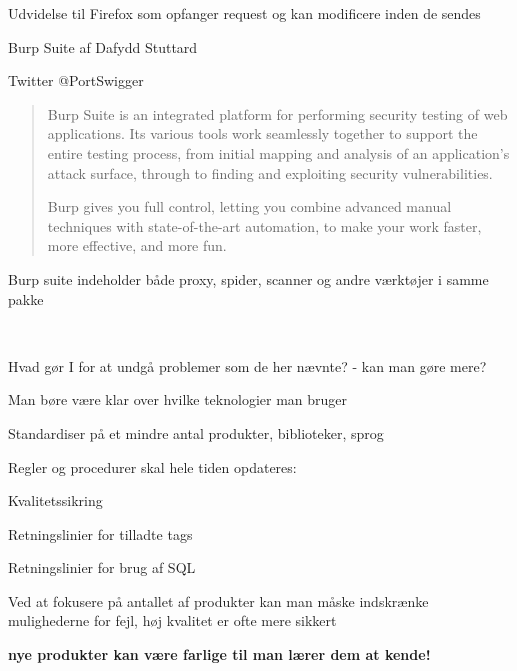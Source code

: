 \documentclass[Screen16to9,17pt]{foils}
\begin{document}



Udvidelse til Firefox som opfanger request og kan modificere inden de sendes\\




\begin{list1}
\item Burp Suite af Dafydd Stuttard 
\item Twitter @PortSwigger
\end{list1}



\begin{quote}
Burp Suite is an integrated platform for performing security testing of web applications. Its various tools work seamlessly together to support the entire testing process, from initial mapping and analysis of an application's attack surface, through to finding and exploiting security vulnerabilities.

Burp gives you full control, letting you combine advanced manual techniques with state-of-the-art automation, to make your work faster, more effective, and more fun.
\end{quote}

Burp suite indeholder både proxy, spider, scanner og andre værktøjer i samme pakke

\\



\begin{list1}
\item Hvad gør I for at undgå problemer som de her nævnte?
- kan man gøre mere?
\item Man børe være klar over hvilke teknologier man bruger
\item Standardiser på et mindre antal produkter, biblioteker, sprog
\item Regler og procedurer skal hele tiden opdateres:
\begin{list2}
\item Kvalitetssikring
\item Retningslinier for tilladte tags
\item Retningslinier for brug af SQL
\end{list2}

\item Ved at fokusere på antallet af produkter kan man måske
  indskrænke mulighederne for fejl, høj kvalitet er ofte mere sikkert

\item {\bf nye produkter kan være farlige til man lærer dem at kende!}
\end{list1}
\end{document}
